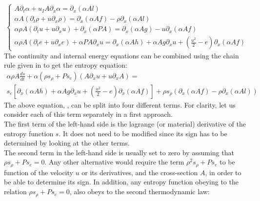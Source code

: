 \begin{equation}
\label{eq:sev_equ4}
\left\{
\begin{array}{llll}
A \partial_t  \alpha + u_I A \partial_x \alpha =  \partial_x \left( \alpha A l \right)\\
\alpha A \left( \partial_t \rho + u \partial_x  \rho \right) = \partial_x \left( \alpha A f \right) - \rho \partial_x \left( \alpha A l \right) \\
\alpha \rho A \left( \partial_t u + u \partial_x u \right)  + \partial_x \left(\alpha P A \right) =  \partial_x \left( \alpha A g \right) - u \partial_x \left( \alpha A f \right) \\
\alpha \rho A  \left( \partial_t e +u  \partial_x e \right) + \alpha P A \partial_x u = \partial_x \left( \alpha A h \right) + \alpha A g \partial_x u + \left( \frac{u^2}{2}-e \right) \partial_x \left( \alpha A f \right)
\end{array}
\right.
\end{equation}
The continuity and internal energy equations can be combined using the chain rule given in  to get the entropy equation:
\begin{eqnarray}
\label{eq:ent_equ2}
\alpha \rho A \frac{ds}{dt} + \alpha \left( \rho s_{\rho} + Ps_e \right) \left( A \partial_x u + u \partial_x A \right) =  \nonumber \\ 
s_e \left[ \partial_x \left( \alpha A h \right) + \alpha A g \partial_x u + \left( \frac{u^2}{2}-e \right) \partial_x \left( \alpha A f \right) \right] 
+ \rho s_{\rho} \left( \partial_x \left( \alpha A f \right) - \rho \partial_x \left( \alpha A l \right) \right) 
\end{eqnarray}
The above equation, , can be split into four different terms. For clarity, let us consider each of this term separately in a first approach.\\ The first term of the left-hand side is the lagrange (or material) derivative of the entropy function $s$. It does not need to be modified since its sign has to be determined by looking at the other terms. \\The second term in the left-hand side is usually set to zero by assuming that $\rho s_{\rho} +P s_e =0$. Any other alternative would require the term $\rho^2 s_{\rho} +P s_e$ to be function of the velocity $u$ or its derivatives, and the cross-section $A$, in order to be able to determine its sign. In addition, any entropy function obeying to the relation $\rho s_{\rho} +P s_e =0$, also obeys to the second thermodynamic law:
